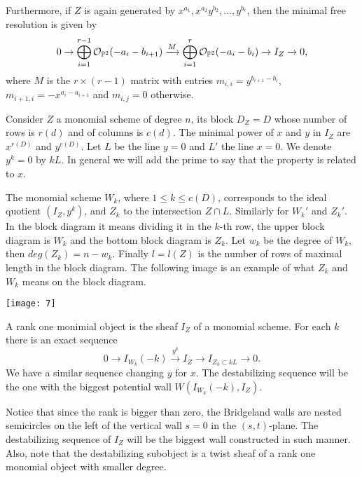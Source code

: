 \documentclass[
	oldfontcommands,
	sumario=abnt-6027-2012,
	12pt,			%
	openright,		%
	oneside,		%
	a4paper,		%
	english,		%
	brazil			%
	]{imecc-unicamp}
\begin{document}
Furthermore, if $Z$ is again generated by $x^{a_1},x^{a_2}y^{b_2},\dots,y^{b_r}$, then the minimal free resolution is given by $$
0\rightarrow \bigoplus_{i=1}^{r-1}{\mathcal O}_{{\mathbb P}^2}(-a_i-b_{i+1})\xrightarrow{M}\bigoplus_{i=1}^r{\mathcal O}_{{\mathbb P}^2}(-a_i-b_i)\rightarrow I_Z\rightarrow 0,
$$
where $M$ is the $r\times (r-1)$ matrix with entries $m_{i,i}=y^{b_{i+1}-b_i}$, $m_{i+1,i}=-x^{a_i-a_{i+1}}$ and $m_{i,j}=0$ otherwise.


Consider $Z$ a monomial scheme of degree $n$, its block $D_Z=D$ whose number of rows is $r(d)$ and of columns is $c(d)$. The minimal power of $x$ and $y$ in $I_Z$ are $x^{r(D)}$ and $y^{c(D)}$. Let $L$ be the line $y=0$ and $L'$ the line $x=0$. We denote $y^k=0$ by $kL$. In general we will add the prime to say that the property is related to $x$.

The monomial scheme $W_k$, where $1\le k\le c(D)$, corresponds to the ideal quotient $(I_Z,y^k)$, and $Z_k$ to the intersection $Z\cap L$. Similarly for $W_k'$ and $Z_k'$. In the block diagram it means dividing it in the $k$-th row, the upper block diagram is $W_k$ and the bottom block diagram is $Z_k$. Let $w_k$ be the degree of $W_k$, then $deg(Z_k)=n-w_k$. Finally $l=l(Z)$ is the number of rows of maximal length in the block diagram. The following image is an example of what $Z_k$ and $W_k$ means on the block diagram.

\begin{center}
	\texttt{[image: 7]}
\end{center}

A rank one monimial object is the sheaf $I_Z$ of a monomial scheme. For each $k$ there is an exact sequence$$
0\rightarrow I_{W_k}(-k)\xrightarrow{y^k} I_Z \rightarrow I_{Z_k\subset kL}\rightarrow 0.
$$
We have a similar sequence changing $y$ for $x$. The destabilizing sequence will be the one with the biggest potential wall $W(I_{W_k}(-k),I_Z)$.

Notice that since the rank is bigger than zero, the Bridgeland walls are nested semicircles on the left of the vertical wall $s=0$ in the $(s,t)$-plane. The destabilizing sequence of $I_Z$ will be the biggest wall constructed in such manner. Also, note that the destabilizing subobject is a twist sheaf of a rank one monomial object with smaller degree.
\end{document}
